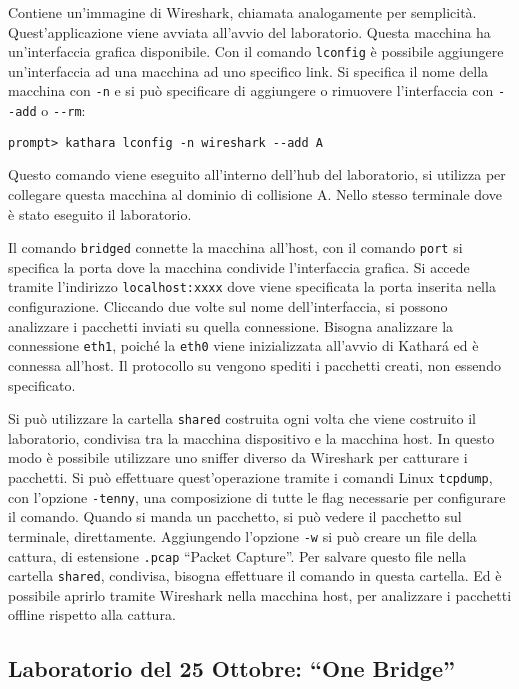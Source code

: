 \documentclass{article}
\numberwithin{equation}{subsection}
\begin{document}
Contiene un'immagine di Wireshark, chiamata analogamente per semplicità. Quest'applicazione viene avviata all'avvio del laboratorio. Questa macchina ha un'interfaccia grafica 
disponibile. Con il comando \verb|lconfig| è possibile aggiungere un'interfaccia ad una macchina ad uno specifico link. Si specifica il nome della macchina con \verb|-n| e 
si può specificare di aggiungere o rimuovere l'interfaccia con \verb|--add| o \verb|--rm|:
\begin{verbatim}
prompt> kathara lconfig -n wireshark --add A
\end{verbatim}
Questo comando viene eseguito all'interno dell'hub del laboratorio, si utilizza per collegare questa macchina al dominio di collisione A. Nello stesso terminale dove 
è stato eseguito il laboratorio. 


Il comando \verb|bridged| connette la macchina all'host, con il comando \verb|port| si specifica la porta dove la macchina condivide l'interfaccia grafica. Si 
accede tramite l'indirizzo \verb|localhost:xxxx| dove viene specificata la porta inserita nella configurazione. 
Cliccando due volte sul nome dell'interfaccia, si possono analizzare i pacchetti inviati su quella connessione. Bisogna analizzare la connessione \verb|eth1|, poiché la 
\verb|eth0| viene inizializzata all'avvio di Kathar\'{a} ed è connessa all'host. 
Il protocollo su vengono spediti i pacchetti creati, non essendo specificato. 


Si può utilizzare la cartella \verb|shared| costruita ogni volta che viene costruito il laboratorio, condivisa tra la macchina dispositivo e la macchina host. In 
questo modo è possibile utilizzare uno sniffer diverso da Wireshark per catturare i pacchetti. Si può effettuare quest'operazione tramite i comandi Linux \verb|tcpdump|, 
con l'opzione \verb|-tenny|, una composizione di tutte le flag necessarie per configurare il comando. Quando si manda un pacchetto, si può vedere il pacchetto sul terminale, 
direttamente. Aggiungendo l'opzione \verb|-w| si può creare un file della cattura, di estensione \verb|.pcap| ``Packet Capture''. Per salvare questo file nella cartella 
\verb|shared|, condivisa, bisogna effettuare il comando in questa cartella. Ed è possibile aprirlo tramite Wireshark nella macchina host, per analizzare i pacchetti 
offline rispetto alla cattura. 

\subsection{Laboratorio del 25 Ottobre: ``One Bridge''}
\end{document}
